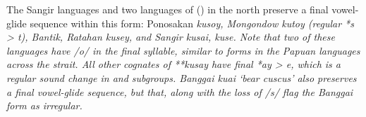 The Sangir languages and two languages of 
() in the north preserve a final vowel-glide
sequence within this form: Ponosakan \it{kusoy},
Mongondow \it{kutoy} (regular *s > \it{t}),
Bantik, Ratahan \it{kusey}, and Sangir \it{kusai, kuse}.
Note that two of these languages have /o/ in the final syllable,
similar to forms in the Papuan  languages across the strait.
All other cognates of **kusay have final *ay > \it{e},
which is a regular sound change in 
and  subgroups.
Banggai \it{kuai} ‘bear cuscus’ also preserves a final vowel-glide
sequence, but that, along with the loss of /s/ flag the Banggai form as irregular.